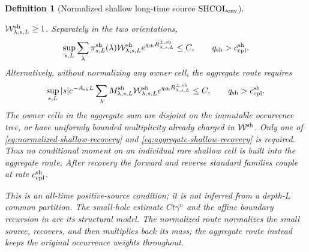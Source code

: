 \documentclass[11pt]{article}
\newtheorem{definition}[theorem]{Definition}
\begin{document}
\begin{definition}[Normalized shallow long-time source
$\mathrm{SHCOL}_{\rm env}$]
\begin{enumerate}[label=\textup{(SH\arabic*)}]
      $\mathcal W^{\rm sh}_{\lambda,s,L}\ge1$.  Separately in the two
      orientations,
      \begin{equation}
      \label{eq:normalized-shallow-recovery}
       \sup_{s,L}\sum_\lambda\pi^{\rm sh}_{s,L}(\lambda)
       \mathcal W^{\rm sh}_{\lambda,s,L}
       e^{q_{\rm sh}R^{\pm,\rm sh}_{\lambda,s,L}}\le C,
       \qquad q_{\rm sh}>c_{\rm cpl}^{\rm sh}.
      \end{equation}
      Alternatively, without normalizing any owner cell, the aggregate
      route requires
      \begin{equation}
      \label{eq:aggregate-shallow-recovery}
       \sup_{s,L}|s|e^{-A_{\rm sh}L}
       \sum_\lambda M^{\rm sh}_{\lambda,s,L}
       \mathcal W^{\rm sh}_{\lambda,s,L}
       e^{q_{\rm sh}R^{\pm,\rm sh}_{\lambda,s,L}}\le C,
       \qquad q_{\rm sh}>c_{\rm cpl}^{\rm sh}.
      \end{equation}
      The owner cells in the aggregate sum are disjoint on the immutable
      occurrence tree, or have uniformly bounded multiplicity already
      charged in $\mathcal W^{\rm sh}$.  Only one of
      \eqref{eq:normalized-shallow-recovery} and
      \eqref{eq:aggregate-shallow-recovery} is required.  Thus no
      conditional moment on an individual rare shallow cell is built into
      the aggregate route.
      After recovery the forward and reverse standard families couple at
      rate $c_{\rm cpl}^{\rm sh}$.
\end{enumerate}
This is an all-time positive-source condition; it is not inferred from a
depth-$L$ common partition.  The small-hole estimate $Ct\gamma^n$ and the
affine boundary recursion in \cite{CanestrariHoles} are its structural
model.  The normalized route normalizes the small source, recovers, and
then multiplies back its mass; the aggregate route instead keeps the
original occurrence weights throughout.
\end{definition}
\end{document}
